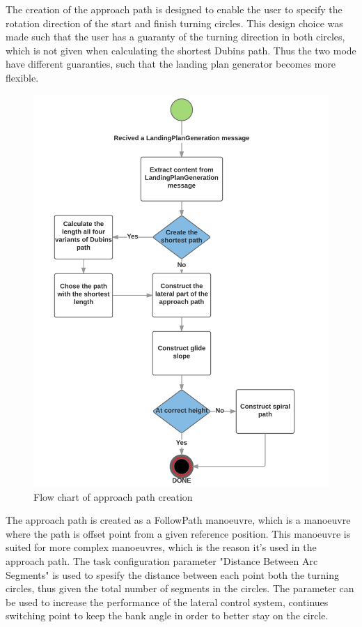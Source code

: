 The creation of the approach path is designed to enable the user to specify the rotation direction of the start and finish turning circles. This design choice was made such that the user has a guaranty of the turning direction in both circles, which is not given when calculating the shortest Dubins path. Thus the two mode have different guaranties, such that the landing plan generator becomes more flexible. 

\begin{figure}[H]
\centering
\includegraphics[scale=0.8]{figs/ApproachPath.png}
\caption{Flow chart of approach path creation}
\label{Fig:FlowChartApproach}
\end{figure}
The approach path is created as a FollowPath manoeuvre, which is a manoeuvre where the path is offset point from a given reference position. This manoeuvre is suited for more complex manoeuvres, which is the reason it's used in the approach path. The task configuration parameter "Distance Between Arc Segments" is used to spesify the distance between each point both the turning circles, thus given the total number of segments in the circles. The parameter can be used to increase the performance of the lateral control system, continues switching point to keep the bank angle in order to better stay on the circle.
